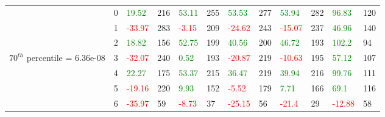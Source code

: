\begin{table}[htb!]
\begin{adjustwidth}{-0.9in}{-0.9in}
\begin{tabular}{|p{5em}|p{2em}|p{3em}|p{3em}|p{3em}|p{3em}|p{3em}|p{3em}|p{3em}|p{3em}|p{3em}|p{3em}|}
            & 0 & \textcolor{green}{19.52} & 216 & \textcolor{green}{53.11} & 255 & \textcolor{green}{53.53} & 277 & \textcolor{green}{53.94} & 282 & \textcolor{green}{96.83} & 120\\\cline{3-12}
            & 1 & \textcolor{red}{-33.97} & 283 & \textcolor{red}{-3.15} & 209 & \textcolor{red}{-24.62} & 243 & \textcolor{red}{-15.07} & 237 & \textcolor{green}{46.96} & 140\\\cline{3-12}
            & 2 & \textcolor{green}{18.82} & 156 & \textcolor{green}{52.75} & 199 & \textcolor{green}{40.56} & 200 & \textcolor{green}{46.72} & 193 & \textcolor{green}{102.2} & 94\\\cline{3-12}
            $70^{th}$ percentile = 6.36e-08 & 3 & \textcolor{red}{-32.07} & 240 & \textcolor{green}{0.52} & 193 & \textcolor{red}{-20.87} & 219 & \textcolor{red}{-10.63} & 195 & \textcolor{green}{57.12} & 107\\[-5.5ex]\cline{3-12}
            & 4 & \textcolor{green}{22.27} & 175 & \textcolor{green}{53.37} & 215 & \textcolor{green}{36.47} & 219 & \textcolor{green}{39.94} & 216 & \textcolor{green}{99.76} & 111\\\cline{3-12}
            & 5 & \textcolor{red}{-19.16} & 220 & \textcolor{green}{9.93} & 152 & \textcolor{red}{-5.52} & 179 & \textcolor{green}{7.71} & 166 & \textcolor{green}{69.1} & 116\\\cline{3-12}
            & 6 & \textcolor{red}{-35.97} & 59 & \textcolor{red}{-8.73} & 37 & \textcolor{red}{-25.15} & 56 & \textcolor{red}{-21.4} & 29 & \textcolor{red}{-12.88} & 58\\\hline\hline
            

\end{tabular}
\end{adjustwidth}
\end{table}
